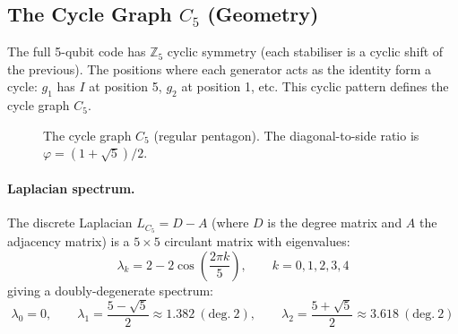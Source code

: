 \documentclass[11pt,a4paper]{article}
\theoremstyle{definition}
\begin{document}
\subsection{The Cycle Graph $C_5$ (Geometry)}

The full 5-qubit code has $\mathbb{Z}_5$ cyclic symmetry (each stabiliser is a cyclic shift of the previous). The positions where each generator acts as the identity form a cycle: $g_1$ has $I$ at position 5, $g_2$ at position 1, etc. This cyclic pattern defines the cycle graph $C_5$.

\begin{figure}[h]
\centering
{}
\caption{The cycle graph $C_5$ (regular pentagon). The diagonal-to-side ratio is $\varphi = (1+\sqrt{5})/2$.}
\label{fig:C5}
\end{figure}

\paragraph{Laplacian spectrum.} The discrete Laplacian $L_{C_5} = D - A$ (where $D$ is the degree matrix and $A$ the adjacency matrix) is a $5 \times 5$ circulant matrix with eigenvalues:
\begin{equation}
\lambda_k = 2 - 2\cos\!\left(\frac{2\pi k}{5}\right), \qquad k = 0, 1, 2, 3, 4
\label{eq:C5eigen}
\end{equation}
giving a doubly-degenerate spectrum:
\begin{equation}
\lambda_0 = 0, \qquad \lambda_1 = \frac{5-\sqrt{5}}{2} \approx 1.382~(\text{deg.}~2), \qquad \lambda_2 = \frac{5+\sqrt{5}}{2} \approx 3.618~(\text{deg.}~2)
\label{eq:C5eigenvals}
\end{equation}
\end{document}

